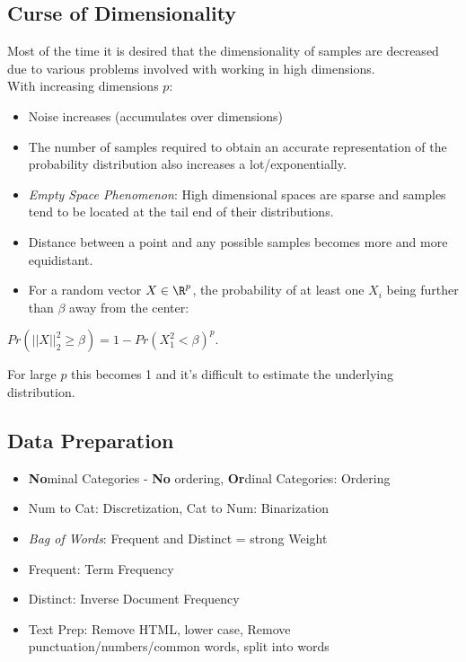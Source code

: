 \documentclass[english]{latex4ei/latex4ei_sheet}
\begin{document}
\begin{sectionbox}
\subsection{Curse of Dimensionality}
Most of the time it is desired that the dimensionality of samples are decreased due to various problems involved with working in high dimensions.\\
With increasing dimensions $p$:
\begin{itemize}
    \item Noise increases (accumulates over dimensions)
    \item The number of samples required to obtain an accurate representation of the probability distribution also increases a lot/exponentially.
    \item \emph{Empty Space Phenomenon}: High dimensional spaces are sparse and samples tend to be located at the tail end of their distributions.
    \item Distance between a point and any possible samples becomes more and more equidistant.
    \item For a random vector $X\in\R^p$, the probability of at least one $X_i$ being further than $\beta$ away from the center:
    \end{itemize}
    \begin{emphbox}
    $Pr(||X||^2_2\ge\beta)=1-Pr(X_1^2<\beta)^p$. 
    \end{emphbox}
    For large $p$ this becomes 1 and it's difficult to estimate the underlying distribution.\\

\subsection{Data Preparation}
\begin{itemize}
    \item \textbf{No}minal Categories - \textbf{No} ordering, \textbf{Or}dinal Categories: Ordering
    \item Num to Cat: Discretization, Cat to Num: Binarization
    \item \emph{Bag of Words}: Frequent and Distinct = strong Weight
    \item Frequent: Term Frequency
    \item Distinct: Inverse Document Frequency
    \item Text Prep: Remove HTML, lower case, Remove punctuation/numbers/common words, split into words
\end{itemize}
\end{sectionbox}
\end{document}
